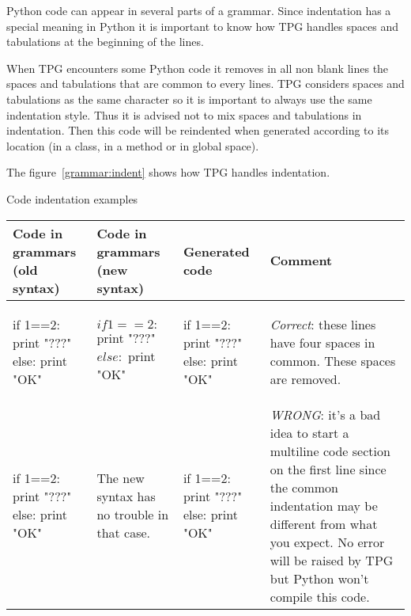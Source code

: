 Python code can appear in several parts of a grammar.
Since indentation has a special meaning in Python it is important to know how TPG handles spaces and tabulations at the beginning of the lines.

When TPG encounters some Python code it removes in all non blank lines the spaces and tabulations that are common to every lines.
TPG considers spaces and tabulations as the same character so it is important to always use the same indentation style.
Thus it is advised not to mix spaces and tabulations in indentation.
Then this code will be reindented when generated according to its location (in a class, in a method or in global space).

The figure~\ref{grammar:indent} shows how TPG handles indentation.

\begin{tableau}
\caption{Code indentation examples}                         \label{grammar:indent}
\begin{tabular}{| p{3.5cm} | p{3.5cm} | p{3cm} | p{3cm} |}
\hline
    Code in grammars (old syntax) & Code in grammars (new syntax) & Generated code & Comment \\
\hline
\hline

    \begin{verbatim*}
{{
    if 1==2:
        print "???"
    else:
        print "OK"
}}
    \end{verbatim*}
    &
    \begin{verbatim*}

$  if 1==2:
$      print "???"
$  else:
$      print "OK"

    \end{verbatim*}
    &
    \begin{verbatim*}

if 1==2:
    print "???"
else:
    print "OK"
    \end{verbatim*}
    &
    \emph{Correct}: these lines have four spaces in common.  These spaces are removed.
    \\

\hline

    \begin{verbatim*}
{{  if 1==2:
        print "???"
    else:
        print "OK"
}}
    \end{verbatim*}
    &
The new syntax has no trouble in that case.
    &
    \begin{verbatim*}
if 1==2:
      print "???"
  else:
      print "OK"
    \end{verbatim*}
    &
    \emph{WRONG}: it's a bad idea to start a multiline code section on the first line since the common indentation may be different from what you expect.  No error will be raised by TPG but Python won't compile this code.
    \\


\end{tabular}
\end{tableau}
